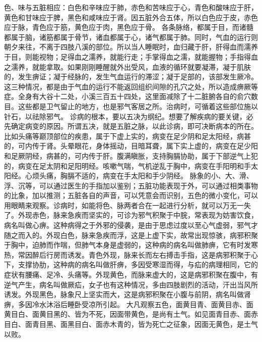 \documentclass[a4paper,12pt,UTF8,twoside]{ctexbook}
\begin{document}
色、味与五脏相应：白色和辛味应于肺，赤色和苦味应于心，青色和酸味应于肝，黄色和甘味应于脾，黑色和咸味应于肾。因五脏外合五体，所以白色应于皮，赤色应于脉，青色应于筋，黄色应于肉，黑色应于骨。
各条脉络，都属于目，而诸髓都属于脑，诸筋都属于骨节，诸血都属于心，诸气都属于肺。同时，气血的运行则朝夕来往，不离于四肢八溪的部位。所以当人睡眠时，血归藏于肝，肝得血而濡养于目，则能视物；足得血之濡养，就能行走；手掌得血之濡，就能握物；手指得血之濡养，就能拿取。如果刚刚睡醒就外出受风，血液的循环就要凝滞，凝于肌肤的，发生痹证；凝于经脉的，发生气血运行的滞涩；凝于足部的，该部发生厥冷。这三种情况，都是由于气血的运行不能返回组织间隙的孔穴之处，所以造成痹厥等症。全身有大谷十二处，小溪三百五十四处，这里面减除了十二脏腑各自的俞穴数目。这些都是卫气留止的地方，也是邪气客居之所。治病时，可循着这些部位施以针石，以祛除邪气。
诊病的根本，要以五决为纲纪。想要了解疾病的要关键，必先确定病变的原因。所谓五决，就是五脏之脉，以此诊病，即可决断病本的所在。比如头痛等巅顶部位的疾患，属于下虚上实的，病变在足少阴和足太阳经，病甚的，可内传于肾。头晕眼花，身体摇动，目暗耳聋，属下实上虚的，病变在足少阳和足厥阴经，病甚的，可内传于肝。腹满瞋胀，支持胸膈协助，属于下部逆气上犯的，病变在足太阴和足阳明经。咳嗽气喘，气机逆乱于胸中，病变在手阳明和手太阳经。心烦头痛，胸膈不适的，病变在手太阳和手少阴经。
脉象的小、大、滑、浮、沉等，可以通过医生的手指加以鉴别；五脏功能表现于外，可以通过相类事物的比象，加以推测；五脏各自的声音，可以凭意会而识别，五色的微小变化，可以用眼睛来观察。诊病时，如能将色、脉两者合在一起进行分析，就可以万无一失了。外现赤色，脉来急疾而坚实的，可诊为邪气积聚于中脘，常表现为妨害饮食，病名叫做心痹。这种病得之于外邪的侵袭，是由于思虑过度以至心气虚弱，邪气才随之而入的。外现白色，脉来急疾而浮，这是上虚下实，故常出现惊骇，病邪积聚于胸中，迫肺而作喘，但肺气本身是虚弱的，这种病的病名叫做肺痹，它有时发寒热，常因醉后行房而诱发。青色外现，脉来长而左右搏击手指，这是病邪积聚于心下，支撑协肋，这种病的病名叫做肝痹，多因受寒湿而得，与疝的病理相同，它的症状有腰痛、足冷、头痛等。外现黄色，而脉来虚大的，这是病邪积聚在腹中，有逆气产生，病名叫做厥疝，女子也有这种情况，多由四肢剧烈的活动，汗出当风所诱发。外现黑色，脉象尺上坚实而大，这是病邪积聚在小腹与前阴，病名叫做肾痹，多因冷水沐浴后睡卧受凉所引起。
大凡观察五色，面黄目青、面黄目赤、面黄目白、面黄目黑的、皆为不死，因面带黄色，是尚有土气。如见面青目赤、面赤目白、面青目黑、面黑目白、面赤木青的，皆为死亡之征象，因面无黄色，是土气以败。
\end{document}
